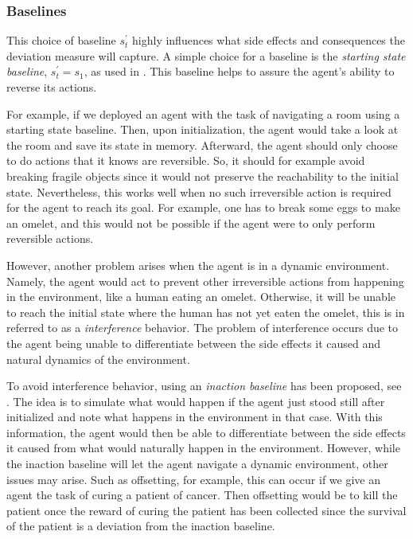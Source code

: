 \documentclass[12pt,A4]{report}
\newcommand{\autobaj}{}
\theoremstyle{definition}
\begin{document}

\subsubsection{Baselines}
This choice of baseline $s^\prime_t$ highly influences what side effects and consequences the deviation measure will capture. A simple choice for a baseline is the \textit{starting state baseline}, $s^{\prime}_t = s_1$, as used in \citet{Eysenbach}. This baseline helps to assure the agent's ability to reverse its actions. 

For example, if we deployed an agent with the task of navigating a room using a starting state baseline. Then, upon initialization, the agent would take a look at the room and save its state in memory. Afterward, the agent should only choose to do actions that it knows are reversible. So, it should for example avoid breaking fragile objects since it would not preserve the reachability to the initial state. Nevertheless, this works well when no such irreversible action is required for the agent to reach its goal. For example, one has to break some eggs to make an omelet, and this would not be possible if the agent were to only perform reversible actions. 

However, another problem arises when the agent is in a dynamic environment. Namely, the agent would act to prevent other irreversible actions from happening in the environment, like a human eating an omelet. Otherwise, it will be unable to reach the initial state where the human has not yet eaten the omelet, this is in \citet{Krakovna19} referred to as a \textit{interference} behavior. The problem of interference occurs due to the agent being unable to differentiate between the side effects it caused and natural dynamics of the environment. 

To avoid interference behavior, using an \textit{inaction baseline} has been proposed, see \citet{Krakovna19}. The idea is to simulate what would happen if the agent just stood still after initialized and note what happens in the environment in that case. With this information, the agent would then be able to differentiate between the side effects it caused from what would naturally happen in the environment. However, while the inaction baseline will let the agent navigate a dynamic environment, other issues may arise. Such as offsetting, for example, this can occur if we give an agent the task of curing a patient of cancer. Then offsetting would be to kill the patient once the reward of curing the patient has been collected since the survival of the patient is a deviation from the inaction baseline.
\end{document}
